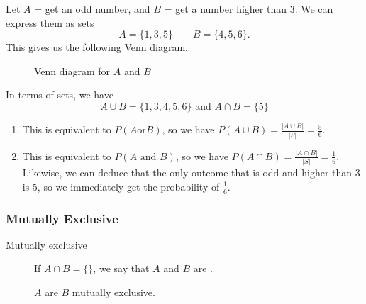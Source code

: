 \begin{frame}[t]
\begin{sol}
Let $A$ = get an odd number, and $B$ = get a number higher than 3. We can express them as sets
\[A = \{1,3,5\} \qquad B = \{4,5,6\}.\]
This gives us the following Venn diagram.
\begin{figure}[h!]
\centering
{}
\caption{Venn diagram for $A$ and $B$}
\end{figure}
\end{sol}
\end{frame}

\begin{frame}[t]
\begin{sol}
In terms of sets, we have
\[A \cup B = \{1,3,4,5,6\} \text{  and  } A \cap B = \{5\}\]
\begin{enumerate}
\item This is equivalent to $P(A \text{or} B)$, so we have $P(A \cup B) = \frac{|A \cup B|}{|S|} = \frac{5}{6}$.
\item This is equivalent to $P(A \text{ and }B)$, so we have $P(A \cap B) = \frac{|A \cap B|}{|S|} = \frac{1}{6}$. Likewise, we can deduce that the only outcome that is odd and higher than 3 is 5, so we immediately get the probability of $\frac{1}{6}$.
\end{enumerate}
\end{sol}
\end{frame}

\begin{frame}
\frametitle{Mutually Exclusive}
\begin{block}{}
\begin{description}
\item[Mutually exclusive] If $A \cap B = \{\}$, we say that $A$ and $B$ are .
\end{description}
\end{block}
\begin{figure}[h!]
\centering
{}
\caption{$A$ are $B$ mutually exclusive.}
\end{figure}
\end{frame}

